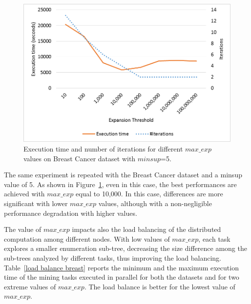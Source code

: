 \begin{figure}[!t]
\includegraphics[width=5in]{chapters/pampa/immagini_extension/breast_fixed.png}
\caption{Execution time and number of iterations for different $max\_exp$ values on Breast Cancer dataset with $minsup$=5.
}
\label{breast_fixed}
\end{figure}

The same experiment is repeated with the Breast Cancer dataset and a minsup value of 5. As shown in Figure~\ref{breast_fixed}, even in this case, the best performances are achieved with $max\_exp$ equal to 10,000. In this case, differences are more significant with lower $max\_exp$ values, although with a non-negligible performance degradation with higher values.

The value of $max\_exp$ impacts also the load balancing
of the distributed computation among different nodes.
With low values of $max\_exp$, each task explores a
smaller enumeration sub-tree, decreasing the size difference
among the sub-trees analyzed by different tasks,
thus improving the load balancing.
Table~\ref{load balance breast} reports the minimum and the maximum execution time of
the mining tasks executed in parallel for both the datasets and for two extreme values of $max\_exp$.
The load balance is better for the lowest value of $max\_exp$.



